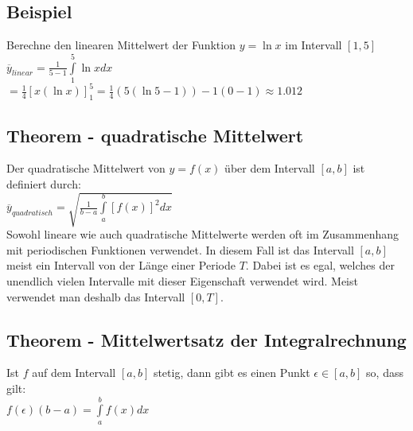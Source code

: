 \documentclass[../main.tex]{subfiles}
\begin{document}
\subsection{Beispiel}
Berechne den linearen Mittelwert der Funktion $y=\ln x$ im Intervall $[1,5]$ \\
$\overline{y}_{linear} = \frac{1}{5-1}\int\limits_1^5\ln xdx$
$ = \frac{1}{4}\left[ x(\ln x)\right]_1^5 = \frac{1}{4}(5(\ln 5-1))-1(0-1) \approx 1.012$

\subsection{Theorem - quadratische Mittelwert}
Der quadratische Mittelwert von $y=f(x)$ über dem Intervall $[a,b]$ ist definiert durch: \\
$\overline{y}_{quadratisch} = \sqrt{\frac{1}{b-a}\int\limits_a^b[f(x)]^2dx}$ \\

Sowohl lineare wie auch quadratische Mittelwerte werden oft im Zusammenhang
mit periodischen Funktionen verwendet. In diesem Fall ist das Intervall $[a,b]$
meist ein Intervall von der Länge einer Periode $T$. Dabei ist es egal, welches
der unendlich vielen Intervalle mit dieser Eigenschaft verwendet wird.
Meist verwendet man deshalb das Intervall $[0,T]$.

\subsection{Theorem - Mittelwertsatz der Integralrechnung}
Ist $f$ auf dem Intervall $[a,b]$ stetig, dann gibt es einen Punkt $\epsilon \in [a,b]$ 
so, dass gilt: \\
$f(\epsilon)(b-a)=\int\limits_a^bf(x)dx$
\end{document}
